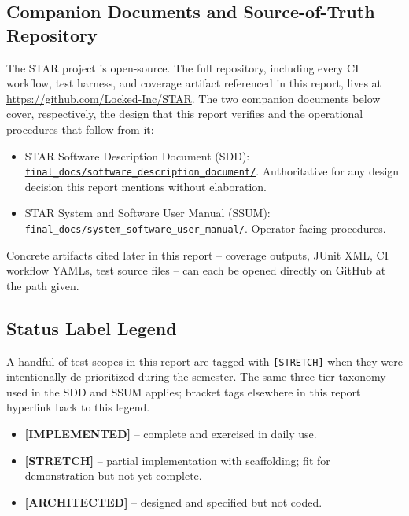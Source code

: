 \documentclass[11pt,letterpaper]{article}
\begin{document}
\subsection{Companion Documents and Source-of-Truth Repository}
The STAR project is open-source. The full repository, including
every CI workflow, test harness, and coverage artifact referenced
in this report, lives at
\url{https://github.com/Locked-Inc/STAR}. The two companion
documents below cover, respectively, the design that this report
verifies and the operational procedures that follow from it:
\begin{itemize}[leftmargin=1.4em,itemsep=2pt]
\item STAR Software Description Document (SDD):
      \href{https://github.com/Locked-Inc/STAR/tree/main/final_docs/software_description_document}{\texttt{final\_docs/software\_description\_document/}}.
      Authoritative for any design decision this report mentions
      without elaboration.
\item STAR System and Software User Manual (SSUM):
      \href{https://github.com/Locked-Inc/STAR/tree/main/final_docs/system_software_user_manual}{\texttt{final\_docs/system\_software\_user\_manual/}}.
      Operator-facing procedures.
\end{itemize}
Concrete artifacts cited later in this report -- coverage outputs,
JUnit XML, CI workflow YAMLs, test source files -- can each be
opened directly on GitHub at the path given.

\subsection{Status Label Legend}
\label{sec:status-legend}
A handful of test scopes in this report are tagged with
\texttt{[STRETCH]} when they were intentionally de-prioritized
during the semester. The same three-tier taxonomy used in the SDD
and SSUM applies; bracket tags elsewhere in this report hyperlink
back to this legend.
\begin{itemize}[leftmargin=1.4em,itemsep=2pt]
\item \textbf{[IMPLEMENTED]} -- complete and exercised in daily use.
\item \textbf{[STRETCH]} -- partial implementation with scaffolding;
      fit for demonstration but not yet complete.
\item \textbf{[ARCHITECTED]} -- designed and specified but not coded.
\end{itemize}
\end{document}
